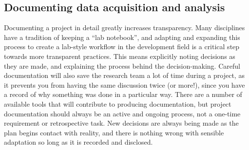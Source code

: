 \documentclass[
]{book}
\begin{document}
\hypertarget{documenting-data-acquisition-and-analysis}{%
\subsection*{Documenting data acquisition and analysis}\label{documenting-data-acquisition-and-analysis}}

Documenting a project in detail greatly increases transparency.
Many disciplines have a tradition of keeping a ``lab notebook'',
and adapting and expanding this process to create a
lab-style workflow in the development field is a
critical step towards more transparent practices.
This means explicitly noting decisions as they are made,
and explaining the process behind the decision-making.
Careful documentation will also save the research team a lot of time during a project,
as it prevents you from having the same discussion twice (or more!),
since you have a record of why something was done in a particular way.
There are a number of available tools
that will contribute to producing documentation,
but project documentation should always be an active and ongoing process,
not a one-time requirement or retrospective task.
New decisions are always being made as the plan begins contact with reality,
and there is nothing wrong with sensible adaptation so long as it is recorded and disclosed.
\end{document}
